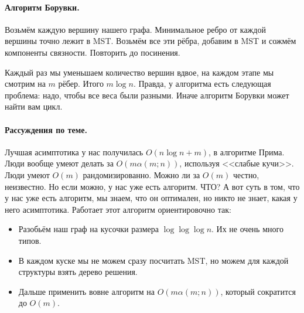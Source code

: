\documentclass{article}
\begin{document}
    \paragraph{Алгоритм Борувки.}
    Возьмём каждую вершину нашего графа. Минимальное ребро от каждой вершины точно лежит в MST. Возьмём все эти рёбра, добавим в MST и сожмём компоненты связности. Повторить до посинения.
    \begin{figure}[H]
    \end{figure}\noindent
    Каждый раз мы уменьшаем количество вершин вдвое, на каждом этапе мы смотрим на $m$ рёбер. Итого $m\log n$. Правда, у алгоритма есть следующая проблема: надо, чтобы все веса были разными. Иначе алгоритм Борувки может найти вам цикл.
    \paragraph{Рассуждения по теме.}
    Лучшая асимптотика у нас получилась $O(n\log n+m)$, в алгоритме Прима. Люди вообще умеют делать за $O(m\alpha(m;n))$, используя <<слабые кучи>>. Люди умеют $O(m)$ рандомизированно. Можно ли за $O(m)$ честно, неизвестно. Но если можно, у нас уже есть алгоритм. ЧТО? А вот суть в том, что у нас уже есть алгоритм, мы знаем, что он оптимален, но никто не знает, какая у него асимптотика. Работает этот алгоритм ориентировочно так:
    \begin{itemize}
        \item Разобьём наш граф на кусочки размера $\log\log\log n$. Их не очень много типов.
        \item В каждом куске мы не можем сразу посчитать MST, но можем для каждой структуры взять дерево решения.
        \item Дальше применить вовне алгоритм на $O(m\alpha(m;n))$, который сократится до $O(m)$.
    \end{itemize}
\end{document}
